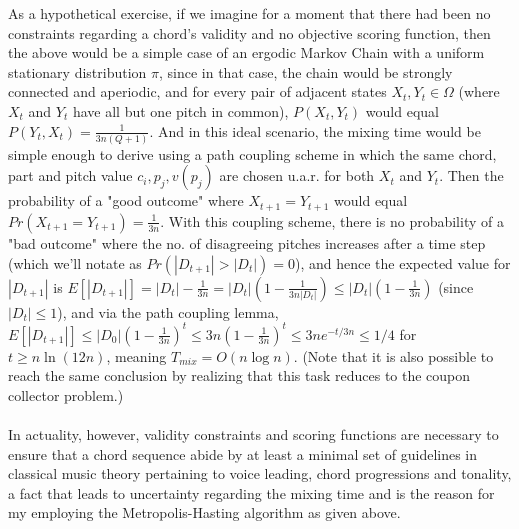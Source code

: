 \documentclass[twoside]{article}
\begin{document}
	
	As a hypothetical exercise, if we imagine for a moment that there had been no constraints regarding a chord's validity and no objective scoring function, then the above would be a simple case of an ergodic Markov Chain with a uniform stationary distribution $\pi$, since in that case, the chain would be strongly connected and aperiodic, and for every pair of adjacent states $X_t,Y_t \in \Omega$ (where $X_t$ and $Y_t$ have all but one pitch in common), $P(X_t,Y_t)$ would equal $P(Y_t,X_t)=\frac{1}{3n(Q+1)}$. And in this ideal scenario, the mixing time would be simple enough to derive using a path coupling scheme in which the same chord, part and pitch value $c_i, p_j, v(p_j)$ are chosen u.a.r. for both $X_t$ and $Y_t$. Then the probability of a "good outcome" where $X_{t+1}=Y_{t+1}$ would equal $Pr(X_{t+1}=Y_{t+1})=\frac{1}{3n}$. With this coupling scheme, there is no probability of a "bad outcome" where the no. of disagreeing pitches increases after a time step (which we'll notate as $Pr(|D_{t+1}|>|D_t|) = 0$), and hence the expected value for $|D_{t+1}|$ is $E[|D_{t+1}|]=|D_t| - \frac{1}{3n} = |D_t|(1 - \frac{1}{3n|D_t|}) \leq |D_t|(1 - \frac{1}{3n})$ (since $|D_t| \leq 1$), and via the path coupling lemma, $E[|D_{t+1}|] \leq |D_0|(1 - \frac{1}{3n})^t \leq 3n(1-\frac{1}{3n})^t \leq 3ne^{-t/3n} \leq 1/4$ for $t \geq n \ln (12n)$, meaning $T_{mix}=O(n \log n)$. (Note that it is also possible to reach the same conclusion by realizing that this task reduces to the coupon collector problem.)
	\\\\
	In actuality, however, validity constraints and scoring functions are necessary to ensure that a chord sequence abide by at least a minimal set of guidelines in classical music theory pertaining to voice leading, chord progressions and tonality, a fact that leads to uncertainty regarding the mixing time and is the reason for my employing the Metropolis-Hasting algorithm as given above.
	
	\iffalse
\end{document}
